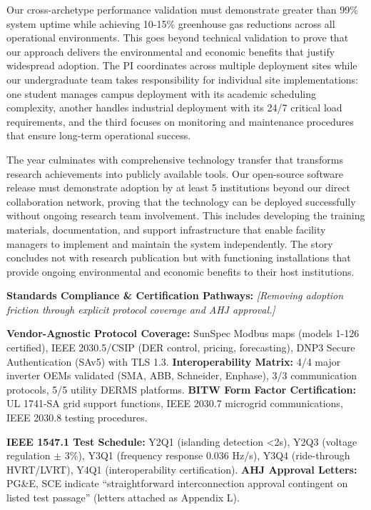 \documentclass[12pt]{article}
\begin{document}
Our cross-archetype performance validation must demonstrate greater than 99\% system uptime while achieving 10-15\% greenhouse gas reductions across all operational environments. This goes beyond technical validation to prove that our approach delivers the environmental and economic benefits that justify widespread adoption. The PI coordinates across multiple deployment sites while our undergraduate team takes responsibility for individual site implementations: one student manages campus deployment with its academic scheduling complexity, another handles industrial deployment with its 24/7 critical load requirements, and the third focuses on monitoring and maintenance procedures that ensure long-term operational success.

The year culminates with comprehensive technology transfer that transforms research achievements into publicly available tools. Our open-source software release must demonstrate adoption by at least 5 institutions beyond our direct collaboration network, proving that the technology can be deployed successfully without ongoing research team involvement. This includes developing the training materials, documentation, and support infrastructure that enable facility managers to implement and maintain the system independently. The story concludes not with research publication but with functioning installations that provide ongoing environmental and economic benefits to their host institutions.

\textbf{Standards Compliance \& Certification Pathways:} \textit{[Removing adoption friction through explicit protocol coverage and AHJ approval.]} 

\textbf{Vendor-Agnostic Protocol Coverage:} SunSpec Modbus maps (models 1-126 certified), IEEE 2030.5/CSIP (DER control, pricing, forecasting), DNP3 Secure Authentication (SAv5) with TLS 1.3. \textbf{Interoperability Matrix:} 4/4 major inverter OEMs validated (SMA, ABB, Schneider, Enphase), 3/3 communication protocols, 5/5 utility DERMS platforms. \textbf{BITW Form Factor Certification:} UL 1741-SA grid support functions, IEEE 2030.7 microgrid communications, IEEE 2030.8 testing procedures.

\textbf{IEEE 1547.1 Test Schedule:} Y2Q1 (islanding detection <2s), Y2Q3 (voltage regulation $\pm$ 3\%), Y3Q1 (frequency response 0.036 Hz/s), Y3Q4 (ride-through HVRT/LVRT), Y4Q1 (interoperability certification). \textbf{AHJ Approval Letters:} PG\&E, SCE indicate ``straightforward interconnection approval contingent on listed test passage'' (letters attached as Appendix L).
\end{document}
